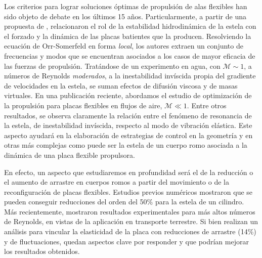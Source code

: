 \documentclass[12pt]{article}
\begin{document}
Los criterios para lograr soluciones óptimas de propulsión de alas flexibles han sido objeto de debate en los últimos 15 años.  Particularmente, a partir de una propuesta de \citet{Triantafyllou:2002p282},  \citet{moored2012hydrodynamic} relacionaron el rol de la estabilidad hidrodinámica de la estela con el forzado y la dinámica de las placas batientes  que la producen. Resolviendo la ecuación de Orr-Somerfeld en forma \textit{local}, los autores extraen un conjunto de frecuencias  y modos que se encuentran asociados a los casos de mayor eficacia de las fuerzas de propulsión. Tratándose de un experimento en agua, con $\mathcal{M}\sim 1$, a números de Reynolds \textit{moderados}, a la inestabilidad invíscida propia del gradiente de velocidades en la estela, se suman efectos  de difusión viscosa y de masas virtuales. 
En una publicación reciente\cite{dadamo2022wake}, abordamos el estudio de  optimización de la propulsión para placas flexibles en flujos de aire, $\mathcal{M}\ll 1$. Entre otros resultados, se observa claramente la relación entre el fenómeno de resonancia de la estela\cite{chomaz2005}, de inestabilidad invíscida\cite{charru2012instabilites}, respecto al modo de vibración elástica. Este aspecto ayudará en la elaboración de estrategias de control en la geometría y en otras más complejas como puede ser  la estela de un cuerpo romo asociada a la dinámica de una placa flexible  propulsora.

En efecto, un aspecto que estudiaremos en profundidad será el de la reducción o el aumento de arrastre en cuerpos romos a partir del movimiento o de la reconfiguración de placas flexibles\cite{gosselin2010drag}. Estudios previos numéricos\cite{wu2016characteristics} mostraron que se pueden conseguir reducciones del orden del 50\% para la estela de un cilindro. Más recientemente, \citet{garcia2021drag} mostraron resultados experimentales para más altos números de Reynolds, en vistas de la aplicación en transporte terrestre. Si bien realizan un análisis para vincular la elasticidad de la placa con reducciones de arrastre (14\%) y de fluctuaciones, quedan aspectos clave por responder y que podrían mejorar los resultados obtenidos.


\begin{small}
	
\end{small}
\end{document}

